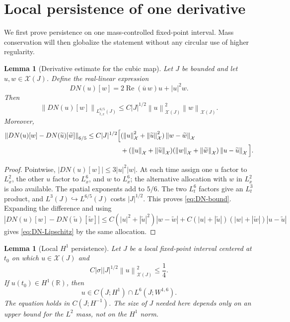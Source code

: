 \documentclass[11pt,oneside]{book}
\newtheorem{lemma}[theorem]{Lemma}
\theoremstyle{definition}
\theoremstyle{remark}
\newcommand{\R}{\mathbb R}
\newcommand{\1}{\mathbf 1}
\newcommand{\Rea}{\operatorname{Re}}
\newcommand{\norm}[1]{\left\lVert #1\right\rVert}
\begin{document}
\section{Local persistence of one derivative}
We first prove persistence on one mass-controlled fixed-point interval.  Mass
conservation will then globalize the statement without any circular use of
higher regularity.

\begin{lemma}[Derivative estimate for the cubic map]
\label{lem:cubic-derivative-map}
Let $J$ be bounded and let $u,w\in\mathcal X(J)$.  Define the real-linear
expression
\[
 DN(u)[w]=2\Rea(\overline u\,w)u+|u|^2w.
\]
Then
\begin{equation}
 \norm{DN(u)[w]}_{L^{6/5}_{t,x}(J)}
 \le C|J|^{1/2}\norm u_{\mathcal X(J)}^2
                      \norm w_{\mathcal X(J)}.     \label{eq:DN-bound}
\end{equation}
Moreover,
\begin{align}
 \norm{DN(u)[w]-DN(\widetilde u)[\widetilde w]}_{6/5}
 \le C|J|^{1/2}\Big[&
 (\norm u_{\mathcal X}^2+\norm{\widetilde u}_{\mathcal X}^2)
 \norm{w-\widetilde w}_{\mathcal X}\notag\\
 &+(\norm u_{\mathcal X}+\norm{\widetilde u}_{\mathcal X})
 (\norm w_{\mathcal X}+\norm{\widetilde w}_{\mathcal X})
 \norm{u-\widetilde u}_{\mathcal X}\Big].          \label{eq:DN-Lipschitz}
\end{align}
\end{lemma}

\begin{proof}
Pointwise, $|DN(u)[w]|\le3|u|^2|w|$.  At each time assign one $u$
factor to $L^2_x$, the other $u$ factor to $L^6_x$, and $w$ to
$L^6_x$; the alternative allocation with $w$ in $L^2_x$ is also
available.  The spatial exponents add to $5/6$.  The two $L^6_t$
factors give an $L^3_t$ product, and
$L^3(J)\hookrightarrow L^{6/5}(J)$ costs $|J|^{1/2}$.  This proves
\eqref{eq:DN-bound}.  Expanding the difference and using
\[
 |DN(u)[w]-DN(\widetilde u)[\widetilde w]|
 \le C(|u|^2+|\widetilde u|^2)|w-\widetilde w|
  +C(|u|+|\widetilde u|)(|w|+|\widetilde w|)|u-\widetilde u|
\]
gives \eqref{eq:DN-Lipschitz} by the same allocation.
\end{proof}

\begin{lemma}[Local $H^1$ persistence]
\label{lem:H1-persistence}
Let $J$ be a local fixed-point interval centered at $t_0$ on which
$u\in\mathcal X(J)$ and
\begin{equation}
 C|\sigma||J|^{1/2}\norm u_{\mathcal X(J)}^2\le\frac14. \label{eq:H1-smallness}
\end{equation}
If $u(t_0)\in H^1(\R)$, then
\[
 u\in C(J;H^1)\cap L^6(J;W^{1,6}).
\]
The equation holds in $C(J;H^{-1})$.  The size of $J$ needed here depends
only on an upper bound for the $L^2$ mass, not on the $H^1$ norm.
\end{lemma}
\end{document}
